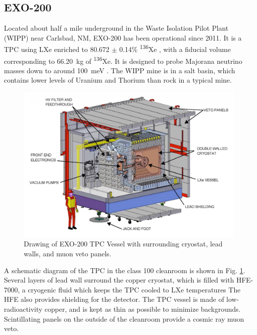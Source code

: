 \subsection{EXO-200}
\label{subsec:EXO200}


Located about half a mile underground in the Waste Isolation Pilot Plant (WIPP) near Carlsbad, NM, EXO-200 has been operational since 2011.  It is a TPC using LXe enriched to 80.672 $\pm$ 0.14\% \textsuperscript{136}Xe \cite{EXO200TwoNuLong}, with a fiducial volume corresponding to 66.20~kg of \textsuperscript{136}Xe. It is designed to probe Majorana neutrino masses down to around 100~meV \cite{EXO200instrumentationPart1}.  The WIPP mine is in a salt basin, which contains lower levels of Uranium and Thorium than rock in a typical mine.

\begin{figure} %
	\centering
	\includegraphics[width=.9\textwidth]{figures/cleanroom.png}
	\caption{Drawing of EXO-200 TPC Vessel with surrounding cryostat, lead walls, and muon veto panels.}
\label{fig:cleanroom}
\end{figure}

A schematic diagram of the TPC in the class 100 cleanroom is shown in Fig. \ref{fig:cleanroom}.  Several layers of lead wall surround the copper cryostat, which is filled with HFE-7000, a cryogenic fluid which keeps the TPC cooled to LXe temperatures  The HFE also provides shielding for the detector.  The TPC vessel is made of low-radioactivity copper, and is kept as thin as possible to minimize backgrounds.  Scintillating panels on the outside of the cleanroom provide a cosmic ray muon veto.

